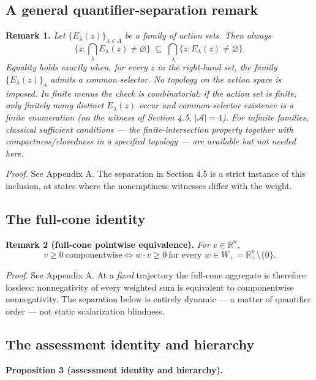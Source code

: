 \documentclass[3p,11pt]{elsarticle}
\begin{document}
\subsection{A general quantifier-separation
remark}\label{a-general-quantifier-separation-remark}

\textbf{Remark 1.} \emph{Let \(\{E_\lambda(z)\}_{\lambda \in \Lambda}\)
be a family of action sets. Then always}
\[\Big\{ z : \textstyle\bigcap_{\lambda} E_\lambda(z) \neq \varnothing \Big\} \;\subseteq\; \bigcap_{\lambda} \big\{ z : E_\lambda(z) \neq \varnothing \big\}.\]
\emph{Equality holds exactly when, for every \(z\) in the right-hand
set, the family \(\{E_\lambda(z)\}_\lambda\) admits a common selector.
No topology on the action space is imposed. In finite menus the check is
combinatorial: if the action set is finite, only finitely many distinct
\(E_\lambda(z)\) occur and common-selector existence is a finite
enumeration (on the witness of Section 4.5, \(|\mathcal{A}| = 4\)). For
infinite families, classical sufficient conditions --- the
finite-intersection property together with compactness/closedness in a specified topology --- are available but not needed here.}

\emph{Proof.} See Appendix A. The separation in Section 4.5 is a strict instance of this inclusion, at states where the nonemptiness witnesses differ with the weight.

\subsection{The full-cone identity}\label{the-full-cone-identity}

\textbf{Remark 2 (full-cone pointwise equivalence).} \emph{For
\(v \in \mathbb{R}^n\),}
\[v \ge 0 \ \text{componentwise} \iff w \cdot v \ge 0 \ \text{for every } w \in W_+ = \mathbb{R}^n_+ \setminus \{0\}.\]

\emph{Proof.} See Appendix A. At a \emph{fixed} trajectory the full-cone aggregate is therefore lossless: nonnegativity of every weighted sum is equivalent to componentwise nonnegativity. The separation below is entirely dynamic --- a matter of quantifier order --- not static scalarization blindness.

\subsection{The assessment identity and
hierarchy}\label{the-assessment-identity-and-hierarchy}

\textbf{Proposition 3 (assessment identity and hierarchy).}
\end{document}
